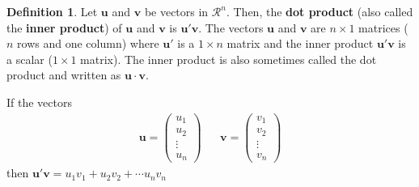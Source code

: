 \documentclass[
]{book}
\theoremstyle{definition}
\newtheorem{definition}{Definition}[chapter]
\theoremstyle{definition}
\theoremstyle{definition}
\theoremstyle{definition}
\theoremstyle{remark}
\begin{document}
\begin{definition}
Let \(\mathbf{u}\) and \(\mathbf{v}\) be vectors in \(\mathcal{R}^n\). Then, the \textbf{dot product} (also called the \textbf{inner product}) of \(\mathbf{u}\) and \(\mathbf{v}\) is \(\mathbf{u}' \mathbf{v}\). The vectors \(\mathbf{u}\) and \(\mathbf{v}\) are \(n \times 1\) matrices (\(n\) rows and one column) where \(\mathbf{u}'\) is a \(1 \times n\) matrix and the inner product \(\mathbf{u}' \mathbf{v}\) is a scalar (\(1 \times 1\) matrix). The inner product is also sometimes called the dot product and written as \(\mathbf{u} \cdot \mathbf{v}\).

If the vectors
\[
\begin{aligned}
\mathbf{u} = \begin{pmatrix} u_1 \\ u_2 \\ \vdots \\ u_n \end{pmatrix} & & \mathbf{v} = \begin{pmatrix} v_1 \\ v_2 \\ \vdots \\ v_n \end{pmatrix} 
\end{aligned}
\]
then \(\mathbf{u}' \mathbf{v} = u_1 v_1 + u_2 v_2 + \cdots u_n v_n\)
\end{definition}
\end{document}
